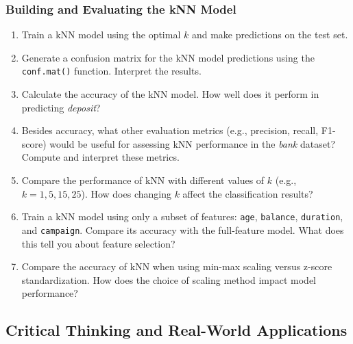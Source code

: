 \documentclass[
  11pt,
]{book}
\newcommand{\passthrough}[1]{#1}
\providecommand{\tightlist}{%
  \setlength{\itemsep}{0pt}\setlength{\parskip}{0pt}}
\theoremstyle{definition}
\theoremstyle{definition}
\theoremstyle{definition}
\theoremstyle{definition}
\theoremstyle{remark}
\begin{document}
\subsubsection*{Building and Evaluating the kNN Model}\label{building-and-evaluating-the-knn-model}


\begin{enumerate}
\def\labelenumi{\arabic{enumi}.}
\setcounter{enumi}{19}
\tightlist
\item
  Train a kNN model using the optimal \(k\) and make predictions on the test set.\\
\item
  Generate a confusion matrix for the kNN model predictions using the \passthrough{\lstinline!conf.mat()!} function. Interpret the results.\\
\item
  Calculate the accuracy of the kNN model. How well does it perform in predicting \emph{deposit}?\\
\item
  Besides accuracy, what other evaluation metrics (e.g., precision, recall, F1-score) would be useful for assessing kNN performance in the \emph{bank} dataset? Compute and interpret these metrics.\\
\item
  Compare the performance of kNN with different values of \(k\) (e.g., \(k = 1, 5, 15, 25\)). How does changing \(k\) affect the classification results?\\
\item
  Train a kNN model using only a subset of features: \passthrough{\lstinline!age!}, \passthrough{\lstinline!balance!}, \passthrough{\lstinline!duration!}, and \passthrough{\lstinline!campaign!}. Compare its accuracy with the full-feature model. What does this tell you about feature selection?\\
\item
  Compare the accuracy of kNN when using min-max scaling versus z-score standardization. How does the choice of scaling method impact model performance?
\end{enumerate}

\subsection*{Critical Thinking and Real-World Applications}\label{critical-thinking-and-real-world-applications}
\end{document}
